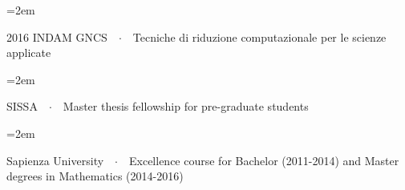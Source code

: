\documentclass{scrartcl}
\newcommand{\Description}[1]{\hangindent=2em\hangafter=0\noindent\raggedright\footnotesize{#1}\par\normalsize\vspace{1em}} %
\begin{document}
\begin{cv}{}
\vspace{-0.5em} %
%
\Description{{\color{violet}2016 INDAM GNCS}\ \ $\cdotp$\ \  Tecniche di riduzione computazionale per le scienze applicate}

\vspace{-0.5em} %

\Description{{\color{violet}SISSA}\ \ $\cdotp$\ \ Master thesis fellowship for pre-graduate students}

\vspace{-0.5em} %

\Description{{\color{violet}Sapienza University}\ \ $\cdotp$\ \ Excellence course for Bachelor (2011-2014) and Master degrees in Mathematics (2014-2016)}




\vspace{1em}


\end{cv}
\end{document}
